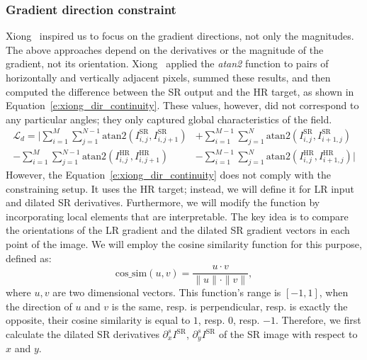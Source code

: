 \subsubsection{Gradient direction constraint}

Xiong~\cite{Xiong2025} inspired us to focus on the gradient directions, not only the magnitudes.
The above approaches depend on the derivatives or the magnitude of the gradient, not its orientation.
Xiong~\cite{Xiong2025} applied the \textit{atan2} function to pairs of horizontally and vertically adjacent pixels, summed these results, and then computed the difference between the SR output and the HR target, as shown in Equation~\eqref{e:xiong_dir_continuity}.
These values, however, did not correspond to any particular angles; they only captured global characteristics of the field.
\begin{equation}
    \begin{aligned}
        \mathcal{L}_d = \biggl| 
        \sum_{i = 1}^M\sum_{j = 1}^{N-1} \text{atan2}\left(I^\text{SR}_{i,j}, I^\text{SR}_{i,j + 1}\right) & +
        \sum_{i = 1}^{M - 1}\sum_{j = 1}^{N} \text{atan2}\left(I^\text{SR}_{i,j}, I^\text{SR}_{i+1,j}\right) \\ -
        \sum_{i = 1}^M\sum_{j = 1}^{N-1} \text{atan2}\left(I^\text{HR}_{i,j}, I^\text{HR}_{i,j + 1}\right) & -
        \sum_{i = 1}^{M - 1}\sum_{j = 1}^{N} \text{atan2}\left(I^\text{HR}_{i,j}, I^\text{HR}_{i+1,j}\right)
        \biggr|
    \end{aligned}
    \label{e:xiong_dir_continuity}
\end{equation}
However, the Equation~\eqref{e:xiong_dir_continuity} does not comply with the constraining setup.
It uses the HR target; instead, we will define it for LR input and dilated SR derivatives.
Furthermore, we will modify the function by incorporating local elements that are interpretable.
The key idea is to compare the orientations of the LR gradient and the dilated SR gradient vectors in each point of the image.
We will employ the cosine similarity function for this purpose, defined as:
\begin{equation}
    \text{cos\_sim}(u, v) = \frac{u \cdot v}{\|u\|\cdot\|v\|},
    \label{e:cos_sim}
\end{equation}
where $u,v$ are two dimensional vectors.
This function's range is $[-1, 1]$, when the direction of $u$ and $v$ is the same, resp. is perpendicular, resp. is exactly the opposite, their cosine similarity is equal to $1$, resp. $0$, resp. $-1$.
Therefore, we first calculate the dilated SR derivatives $\partial_x^s I^\text{SR}$, $\partial_y^s I^\text{SR}$ of the SR image with respect to $x$ and $y$.
